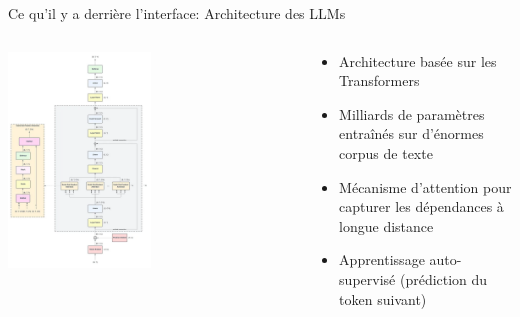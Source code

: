 \documentclass[aspectratio=169]{beamer}
\begin{document}
\begin{frame}{Ce qu'il y a derrière l'interface: Architecture des LLMs}
    \begin{columns}
        \begin{column}{0.6\textwidth}
            \begin{center}
                \includegraphics[width=0.5\textwidth]{images/gpt2.png}
            \end{center}
        \end{column}
        \begin{column}{0.4\textwidth}
            \begin{itemize}
                \item Architecture basée sur les Transformers
                \item Milliards de paramètres entraînés sur d'énormes corpus de texte
                \item Mécanisme d'attention pour capturer les dépendances à longue distance
                \item Apprentissage auto-supervisé (prédiction du token suivant)
            \end{itemize}
        \end{column}
    \end{columns}
\end{frame}
\end{document}
